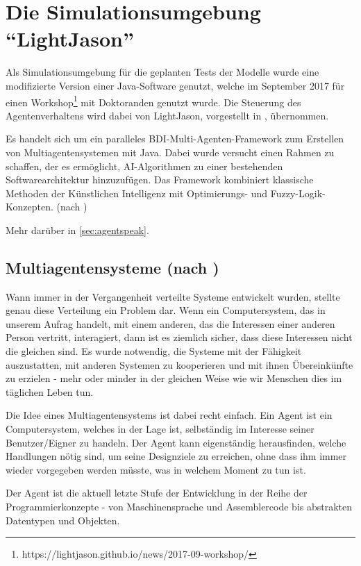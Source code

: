 \section{Die Simulationsumgebung \enquote{LightJason}}

Als Simulationsumgebung für die geplanten Tests der Modelle wurde eine modifizierte Version einer Java-Software genutzt, welche im September 2017 für einen Workshop\footnote{https://lightjason.github.io/news/2017-09-workshop/} mit Doktoranden genutzt wurde.
Die Steuerung des Agentenverhaltens wird dabei von LightJason, vorgestellt in \cite{lightjason}, übernommen.

Es handelt sich um ein paralleles BDI-Multi-Agenten-Framework zum Erstellen von Multiagentensystemen mit Java. 
Dabei wurde versucht einen Rahmen zu schaffen, der es ermöglicht, AI-Algorithmen zu einer bestehenden Softwarearchitektur hinzuzufügen. 
Das Framework kombiniert klassische Methoden der Künstlichen Intelligenz mit Optimierungs- und Fuzzy-Logik-Konzepten.
(nach \cite{lightjason-web})

Mehr darüber in \cref{sec:agentspeak}.

\subsection{Multiagentensysteme (nach \cite{multiagent})}

Wann immer in der Vergangenheit verteilte Systeme entwickelt wurden, stellte genau diese Verteilung ein Problem dar. 
Wenn ein Computersystem, das in unserem Aufrag handelt, mit einem anderen, das die Interessen einer anderen Person vertritt, interagiert, dann ist es ziemlich sicher, dass diese Interessen nicht die gleichen sind.
Es wurde notwendig, die Systeme mit der Fähigkeit auszustatten, mit anderen Systemen zu kooperieren und mit ihnen Übereinkünfte zu erzielen - mehr oder minder in der gleichen Weise wie wir Menschen dies im täglichen Leben tun.

Die Idee eines Multiagentensystems ist dabei recht einfach.
Ein Agent ist ein Computersystem, welches in der Lage ist, selbständig im Interesse seiner Benutzer/Eigner zu handeln.
Der Agent kann eigenständig herausfinden, welche Handlungen nötig sind, um seine Designziele zu erreichen, ohne dass ihm immer wieder vorgegeben werden müsste, was in welchem Moment zu tun ist.

Der Agent ist die aktuell letzte Stufe der Entwicklung in der Reihe der Programmierkonzepte - von Maschinensprache und Assemblercode bis abstrakten Datentypen und Objekten.

